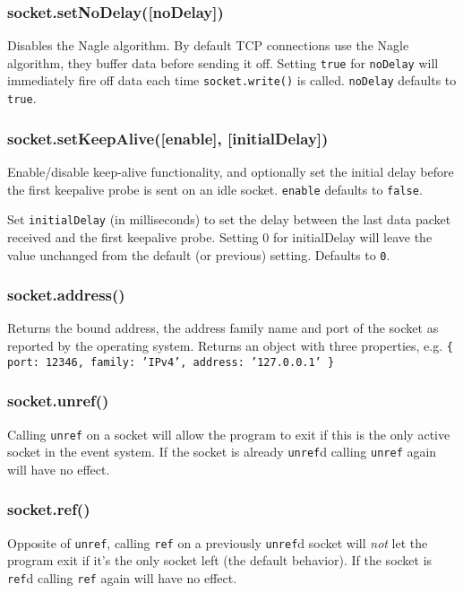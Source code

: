 \subsubsection{socket.setNoDelay({[}noDelay{]})}

Disables the Nagle algorithm. By default TCP connections use the Nagle
algorithm, they buffer data before sending it off. Setting \texttt{true}
for \texttt{noDelay} will immediately fire off data each time
\texttt{socket.write()} is called. \texttt{noDelay} defaults to
\texttt{true}.

\subsubsection{socket.setKeepAlive({[}enable{]}, {[}initialDelay{]})}

Enable/disable keep-alive functionality, and optionally set the initial
delay before the first keepalive probe is sent on an idle socket.
\texttt{enable} defaults to \texttt{false}.

Set \texttt{initialDelay} (in milliseconds) to set the delay between the
last data packet received and the first keepalive probe. Setting 0 for
initialDelay will leave the value unchanged from the default (or
previous) setting. Defaults to \texttt{0}.

\subsubsection{socket.address()}

Returns the bound address, the address family name and port of the
socket as reported by the operating system. Returns an object with three
properties, e.g.
\texttt{\{ port: 12346, family: 'IPv4', address: '127.0.0.1' \}}

\subsubsection{socket.unref()}

Calling \texttt{unref} on a socket will allow the program to exit if
this is the only active socket in the event system. If the socket is
already \texttt{unref}d calling \texttt{unref} again will have no
effect.

\subsubsection{socket.ref()}

Opposite of \texttt{unref}, calling \texttt{ref} on a previously
\texttt{unref}d socket will \emph{not} let the program exit if it's the
only socket left (the default behavior). If the socket is \texttt{ref}d
calling \texttt{ref} again will have no effect.

